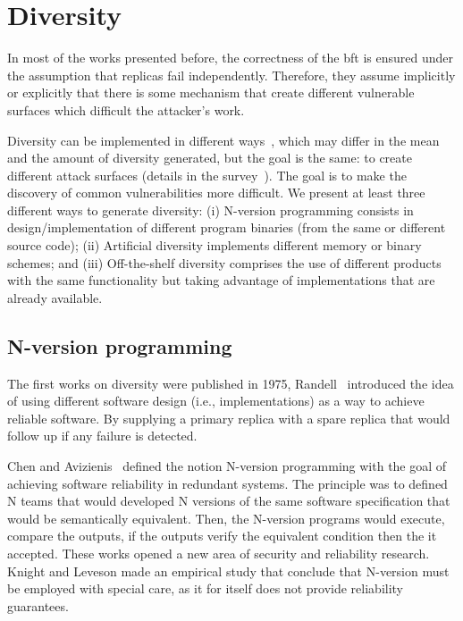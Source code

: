 \section{Diversity}
In most of the works presented before, the correctness of the \gls{bft} is ensured under the assumption that replicas fail independently.
Therefore, they assume implicitly or explicitly that there is some mechanism that create different vulnerable surfaces which difficult the attacker's work.

Diversity can be implemented in different ways~\cite{Deswarte:1998,Obelheiro:2006}, which may differ in the mean and the amount of diversity generated, but the goal is the same: to create different attack surfaces (details in the survey~\cite{Baudry:2015}). 
The goal is to make the discovery of common vulnerabilities more difficult. 
We present at least three different ways to generate diversity: 
(i) N-version programming consists in design/implementation of different program binaries (from the same or different source code); 
(ii) Artificial diversity implements different memory or binary schemes; 
and (iii) Off-the-shelf diversity comprises the use of different products with the same functionality but taking advantage of implementations that are already available.

\subsection{N-version programming}
The first works on diversity were published in 1975, Randell~\etal{} introduced the idea of using different software design (i.e., implementations) as a way to achieve reliable software. 
By supplying a primary replica with a spare replica that would follow up if any failure is detected.

Chen and Avizienis~\cite{Avizienis:1977,Chen:1978} defined the notion N-version programming with the goal of achieving software reliability in redundant systems.
The principle was to defined N teams that would developed N versions of the same software specification that would be semantically equivalent.
Then, the N-version programs would execute, compare the outputs, if the outputs verify the equivalent condition then the it accepted.
These works opened a new area of security and reliability research.
Knight and Leveson made an empirical study that conclude that N-version must be employed with special care, as it for itself does not provide reliability guarantees.

